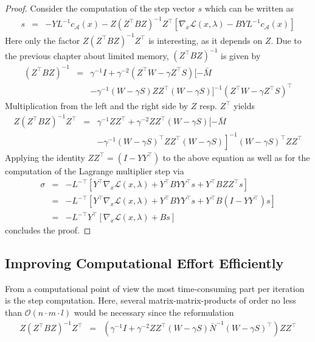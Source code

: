 \documentclass{svmult}
\begin{document}
\begin{proof}
	Consider the computation of the step vector $s$ which can be written as
	\begin{eqnarray*}
		s&=& -YL^{-1}c_{\mathcal{A}}(x)-Z(Z^{\top}BZ)^{-1}Z^{\top}\left[\nabla_x \mathcal{L}(x,\lambda) -BYL^{-1}c_{\mathcal{A}}(x)\right]
	\end{eqnarray*}
	Here only the factor $Z(Z^{\top}BZ)^{-1}Z^{\top}$ is interesting, as it depends on $Z$. Due to the previous chapter about limited memory,
	$(Z^{\top}BZ)^{-1}$ is given by
	\begin{eqnarray*}
		(Z^{\top}BZ)^{-1}&=&\gamma^{-1} I +\gamma^{-2}(Z^{\top}W-\gamma Z^{\top}S) [-\bar{M}\\
			& &-\gamma^{-1} (W-\gamma S) ZZ^{\top} (W-\gamma S)]^{-1}(Z^{\top}W-\gamma Z^{\top}S)^{\top}
	\end{eqnarray*}
	Multiplication from the left and the right side by $Z$ resp. $Z^{\top}$ yields
	\begin{eqnarray*}
		Z(Z^{\top}BZ)^{-1}Z^{\top} &=&\gamma^{-1} ZZ^{\top} +\gamma^{-2}ZZ^{\top}\left(W-\gamma S\right) [-\bar{M}\\
			& &\left.-\gamma^{-1} (W-\gamma S)^{\top} ZZ^{\top} (W-\gamma S)\right]^{-1}\left(W-\gamma S\right)^{\top}ZZ^{\top}
	\end{eqnarray*}
	Applying the identity $ZZ^{\top}=(I-YY^{\top})$ to the above equation as well as for the computation of the Lagrange multiplier step via
	\begin{eqnarray*}
		\sigma&=&-L^{-\top}\left[Y^{\top}\nabla_x \mathcal{L}(x,\lambda)+Y^{\top}BYY^{\top}s+Y^{\top}BZZ^{\top}s\right]\\
			&=&-L^{-\top}\left[Y^{\top}\nabla_x \mathcal{L}(x,\lambda)+Y^{\top}BYY^{\top}s+Y^{\top}B(I-YY^{\top})s\right]\\
			&=&-L^{-\top}Y^{\top}\left[\nabla_x \mathcal{L}(x,\lambda)+Bs\right]
	\end{eqnarray*}
	concludes the proof.
\end{proof}




               
\subsection{Improving Computational Effort Efficiently}
\noindent From a computational point of view the most time-consuming part per iteration is the step computation. Here, several matrix-matrix-products of order no less than $\mathcal{O}(n\cdot m \cdot l)$ would be necessary since the reformulation 
\begin{eqnarray*}
	Z(Z^{\top}BZ)^{-1}Z^{\top}	&=&(\gamma^{-1}I +\gamma^{-2}ZZ^{\top}(W-\gamma S) \bar{N}^{-1}(W-\gamma S)^{\top})ZZ^{\top}
\end{eqnarray*}
\end{document}
